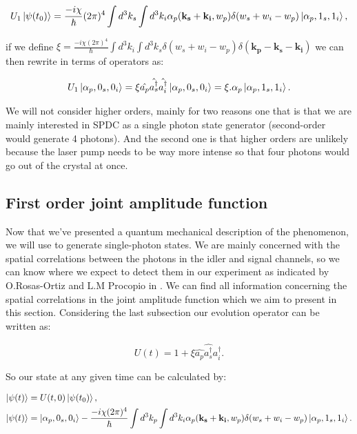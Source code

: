 \documentclass[12pt]{book}
\begin{document}
\begin{equation}
U_{1}\ket{\psi(t_{0})}=\frac{-i\chi}{\hbar} (2 \pi)^{4} \int d^{3}k_{s}\int d^{3}k_{i} \alpha_{p}(\mathbf{k_{s}}+\mathbf{k_{i}},w_{p}) \delta(w_{s}+w_{i}-w_{p})\ket{\alpha_{p},1_{s},1_{i}},
\end{equation}

if we define $\xi=\frac{-i\chi(2 \pi)^{4}}{\hbar} \int d^{3}k_{i} \int d^{3}k_{s}\delta(w_{s}+w_{i}-w_{p}) \delta(\mathbf{k_{p}}-\mathbf{k_{s}}-\mathbf{k_{i}})$ we can then rewrite in terms of operators as:

\begin{equation}
U_{1}\ket{\alpha_{p},0_{s},0_{i}}=\xi \hat{a_{p}}\hat{a_{s}^{\dagger}}\hat{a_{i}^{\dagger}}\ket{\alpha_{p},0_{s},0_{i}}=\xi. \alpha_{p} \ket{\alpha_{p},1_{s},1_{i}}.
\end{equation}

We will not consider higher orders, mainly for two reasons one that is that we are mainly interested in SPDC as a single photon state generator (second-order would generate 4 photons). And the second one is that higher orders are unlikely because the laser pump needs to be way more intense so that four photons would go out of the crystal at once.

\subsection{First order joint amplitude function}

Now that we've presented a quantum mechanical description of the phenomenon, we will use to generate single-photon states. We are mainly concerned with the spatial correlations between the photons in the idler and signal channels, so we can know where we expect to detect them in our experiment as indicated by O.Rosas-Ortiz and L.M Procopio in \cite{procopio}. We can find all information concerning the spatial correlations in the joint amplitude function which we aim to present in this section. Considering the last subsection our evolution operator can be written as:

\begin{equation}
U(t)=1+\xi \hat{a_{p}}\hat{a_{s}^{\dagger}}\hat{a_{i}^{\dagger}}.
\end{equation}

So our state at any given time can be calculated by:

\begin{align}
\ket{\psi(t)}&=U(t,0)\ket{\psi(t_{0})},\\
\ket{\psi(t)}&=\ket{\alpha_{p},0_{s},0_{i}}-\frac{-i \chi (2 \pi)^{4}}{\hbar} \int d^{3}k_{p} \int d^{3}k_{i} \alpha_{p}(\mathbf{k_{s}}+\mathbf{k_{i}},w_{p}) \delta(w_{s}+w_{i}-w_{p})\ket{\alpha_{p},1_{s},1_{i}}.
\end{align}
\end{document}
